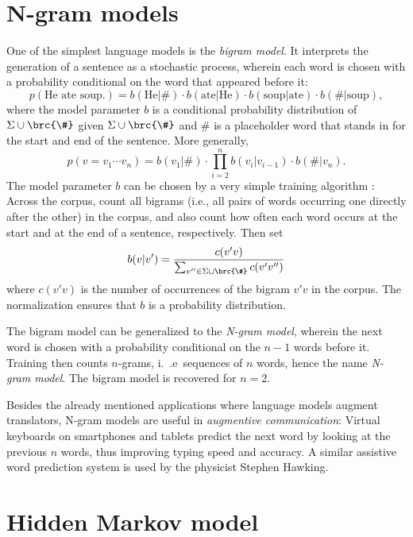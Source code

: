 \section{N-gram models}

One of the simplest language models is the \emph{bigram model}. It interprets
the generation of a sentence as a stochastic process, wherein each word is
chosen with a probability conditional on the word that appeared before it:
\[
 p(\text{He ate soup.}) = b(\text{He}|\#) \cdot b(\text{ate}|\text{He}) \cdot b(\text{soup}|\text{ate}) \cdot b(\#|\text{soup}),
\]
where the model parameter $b$ is a conditional probability distribution of
$\Sigma\cup\brc{\#}$ given $\Sigma\cup\brc{\#}$ and $\#$ is a placeholder word
that stands in for the start and end of the sentence. More generally,
\[
 p(v = v_1\cdots v_n) = b(v_1|\#) \cdot \prod_{i=2}^n b(v_i|v_{i-1}) \cdot b(\#|v_n).
\]
The model parameter $b$ can be chosen by a very simple training algorithm
\cite[pp.~123]{jm09}: Across the corpus, count all bigrams (i.e., all pairs of
words occurring one directly after the other) in the corpus, and also count how
often each word occurs at the start and at the end of a sentence, respectively.
Then set
\[
 b(v|v') = \frac{c(v'v)}{\sum_{v''\in \Sigma\cup\brc{\#}} c(v'v'')}
\]
where $c(v'v)$ is the number of occurrences of the bigram $v'v$ in the corpus.
The normalization ensures that $b$ is a probability distribution.

The bigram model can be generalized to the \emph{N-gram model}, wherein the
next word is chosen with a probability conditional on the $n-1$ words before
it. Training then counts $n$-grams, i.~.e~sequences of $n$ words, hence the
name \emph{N-gram model}. The bigram model is recovered for $n=2$.

Besides the already mentioned applications where language models augment
translators, N-gram models are useful in \emph{augmentive communication}:
Virtual keyboards on smartphones and tablets predict the next word by looking
at the previous $n$ words, thus improving typing speed and accuracy.
\cite{hasan2004n} A similar assistive word prediction system is used by the
physicist Stephen Hawking. \cite{newelletal1998}

\section{Hidden Markov model}

